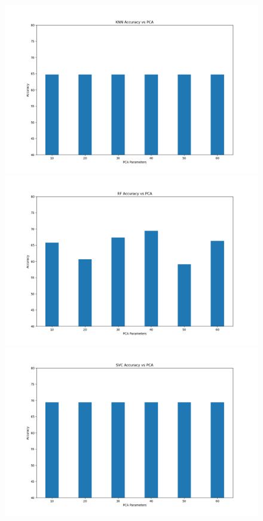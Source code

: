 \documentclass[onecolumn]{article}
\begin{document}
\clearpage
\begin{figure}[h]
    \centering
    \begin{minipage}{0.4\textwidth}
        \centering
        \includegraphics[width=1.3\textwidth]{pca_KNN.png} %
    \end{minipage}
    \begin{minipage}{0.4\textwidth}
        \centering
        \includegraphics[width=1.3\textwidth]{pca_RF.png} %
    \end{minipage}
    \bigbreak
    \begin{minipage}{0.4\textwidth}
        \centering
        \includegraphics[width=1.3\textwidth]{pca_SVC.png} %

\end{minipage}
\end{figure}
\end{document}
